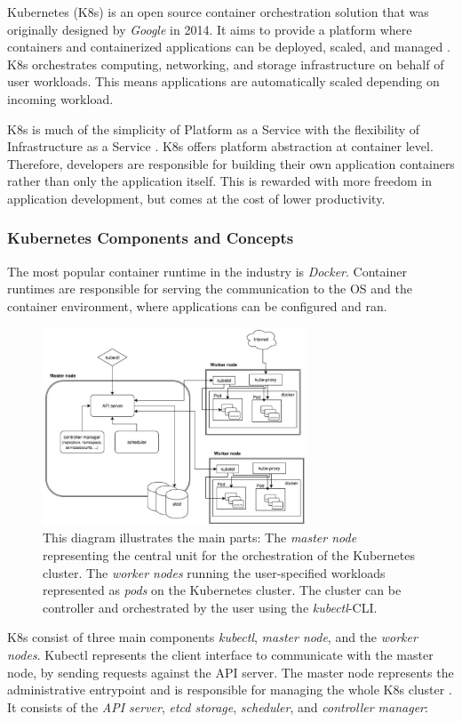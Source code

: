 Kubernetes (K8s) is an open source container orchestration solution that was originally designed by \textit{Google} in 2014. It aims to provide a platform where containers and containerized applications can be deployed, scaled, and managed \cite{Wikik8s}. K8s orchestrates computing, networking, and storage infrastructure on behalf of user workloads. This means applications are automatically scaled depending on incoming workload.

K8s is much of the simplicity of Platform as a Service with the flexibility of Infrastructure as a Service \cite{k8s}. K8s offers platform abstraction at container level. Therefore, developers are responsible for building their own application containers rather than only the application itself. This is rewarded with more freedom in application development, but comes at the cost of lower productivity.

\subsubsection*{Kubernetes Components and Concepts}
The most popular container runtime in the industry is \textit{Docker}. Container runtimes are responsible for serving the communication to the OS and the container environment, where applications can be configured and ran.
\begin{figure}
	\centering
	\includegraphics[width=0.7\textwidth]{resources/k8s_architecture}
	\caption[Architecture Diagram of K8s]{This diagram illustrates the main parts: The \textit{master node} representing the central unit for the orchestration of the Kubernetes cluster. The \textit{worker nodes} running the user-specified workloads represented as \textit{pods} on the Kubernetes cluster. The cluster can be controller and orchestrated by the user using the \textit{kubectl}-CLI. \cite{K8sArch}}
	\label{k8s_architecture}
\end{figure}
K8s consist of three main components \textit{kubectl}, \textit{master node}, and the \textit{worker nodes}. Kubectl represents the client interface to communicate with the master node, by sending requests against the API server. The master node represents the administrative entrypoint and is responsible for managing the whole K8s cluster \cite{K8sArch}. It consists of the \textit{API server}, \textit{etcd storage}, \textit{scheduler}, and \textit{controller manager}:

